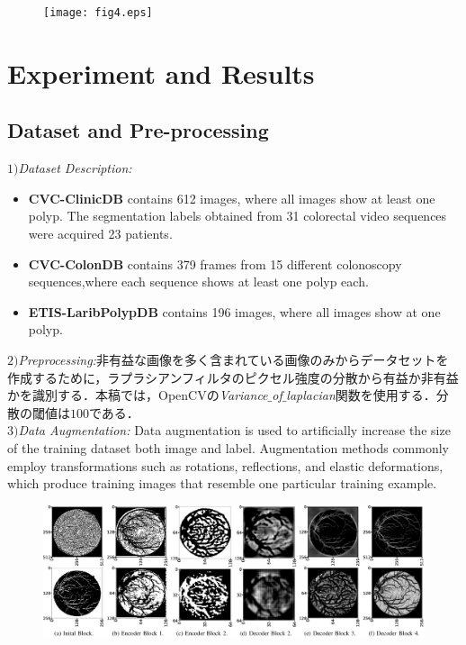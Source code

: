 \documentclass{article}
\begin{document}
\begin{figure}[t]
\begin{center}
\texttt{[image: fig4.eps]}
\caption{}
\end{center}
\end{figure}
\section{Experiment and Results}
\label{sec:res}
\subsection{Dataset and Pre-processing}
\(1)\){\it Dataset Description:}
\begin{itemize}
\item {\bf CVC-ClinicDB} contains 612 images, where all images show at least one polyp. The segmentation labels obtained from 31 colorectal video sequences were acquired 23 patients.
\item {\bf CVC-ColonDB} contains 379 frames from 15 different colonoscopy sequences,where each sequence shows at least one polyp each.
\item {\bf ETIS-LaribPolypDB} contains 196 images, where all images show at one polyp. 
\end{itemize}
\(2)\){\it Preprocessing:}非有益な画像を多く含まれている画像のみからデータセットを作成するために，ラプラシアンフィルタのピクセル強度の分散から有益か非有益かを識別する．本稿では，OpenCVの{\it Variance$\_$of$\_$laplacian}関数を使用する．分散の閾値は$100$である．\\
\(3)\){\it Data Augmentation:} Data augmentation is used to artificially increase the size of the training dataset both image and label. Augmentation methods commonly employ transformations such as rotations, reflections, and elastic deformations, which produce training images that resemble one particular training example.
\begin{figure}[t]
\begin{center}
\includegraphics[width=180mm]{fig3.eps}
\caption{ }
\end{center}
\end{figure}
\end{document}
